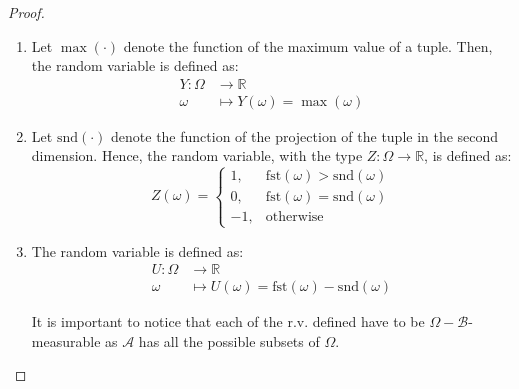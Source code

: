 \documentclass[11pt]{article}
\theoremstyle{definition}
\theoremstyle{remark}
\theoremstyle{remark}
\newcommand{\R}{{\mathbb{R}}}
\newcommand{\fst}{\mathrm{fst}}
\newcommand{\snd}{\mathrm{snd}}
\begin{document}
\begin{proof}
\begin{enumerate}[label=\alph*)]
  \item Let $\max(\cdot)$ denote the function of the maximum value of
    a tuple. Then, the random variable is defined as:
    \begin{align*}
      Y : \Omega & \rightarrow \R \\
      \omega& \mapsto Y(\omega) = \max(\omega)
    \end{align*}

  \item Let $\snd(\cdot)$ denote the function of the projection of the
    tuple in the second dimension. Hence, the random variable, with
    the type $Z : \Omega \rightarrow \R$, is defined as:
    \begin{equation*}
      Z(\omega) =
      \begin{cases}
        1, &\fst(\omega) > \snd(\omega) \\
        0, &\fst(\omega) = \snd(\omega) \\
        -1, &\text{otherwise}
      \end{cases}
    \end{equation*}

  \item The random variable is defined as:
    \begin{align*}
      U : \Omega & \rightarrow \R \\
      \omega& \mapsto U(\omega) = \fst(\omega) - \snd(\omega)
    \end{align*}

    It is important to notice that each of the r.v. defined have to be
    $\Omega-\mathcal{B}$-measurable as $\mathcal{A}$ has all the
    possible subsets of $\Omega$.
  \end{enumerate}
\end{proof}
\end{document}
